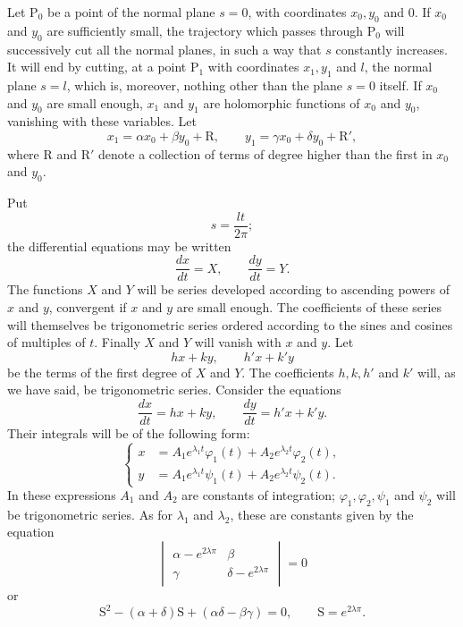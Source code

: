 \documentclass[11pt]{article}
\begin{document}
Let $\mathrm{P}_0$ be a point of the normal plane $s=0$, with coordinates $x_0,y_0$ and $0$. If $x_0$ and $y_0$ are sufficiently small, the trajectory which passes through $\mathrm{P}_0$ will successively cut all the normal planes, in such a way that $s$ constantly increases. It will end by cutting, at a point $\mathrm{P}_1$ with coordinates $x_1,y_1$ and $l$, the normal plane $s=l$, which is, moreover, nothing other than the plane $s=0$ itself. If $x_0$ and $y_0$ are small enough, $x_1$ and $y_1$ are holomorphic functions of $x_0$ and $y_0$, vanishing with these variables. Let
\[
x_1=\alpha x_0+\beta y_0+\mathrm{R},
\qquad
y_1=\gamma x_0+\delta y_0+\mathrm{R}',
\]
where $\mathrm{R}$ and $\mathrm{R}'$ denote a collection of terms of degree higher than the first in $x_0$ and $y_0$.

Put
\[
s=\frac{lt}{2\pi};
\]
the differential equations may be written
\[
\frac{dx}{dt}=X,
\qquad
\frac{dy}{dt}=Y.
\]
The functions $X$ and $Y$ will be series developed according to ascending powers of $x$ and $y$, convergent if $x$ and $y$ are small enough. The coefficients of these series will themselves be trigonometric series ordered according to the sines and cosines of multiples of $t$. Finally $X$ and $Y$ will vanish with $x$ and $y$. Let
\[
hx+ky,
\qquad
h'x+k'y
\]
be the terms of the first degree of $X$ and $Y$. The coefficients $h,k,h'$ and $k'$ will, as we have said, be trigonometric series. Consider the equations
\[
\frac{dx}{dt}=hx+ky,
\qquad
\frac{dy}{dt}=h'x+k'y.
\]
Their integrals will be of the following form:
\begin{equation}
\left\{
\begin{aligned}
x&=A_1e^{\lambda_1t}\varphi_1(t)+A_2e^{\lambda_2t}\varphi_2(t),\\
y&=A_1e^{\lambda_1t}\psi_1(t)+A_2e^{\lambda_2t}\psi_2(t).
\end{aligned}
\right.
\tag{1}
\end{equation}
In these expressions $A_1$ and $A_2$ are constants of integration; $\varphi_1,\varphi_2,\psi_1$ and $\psi_2$ will be trigonometric series. As for $\lambda_1$ and $\lambda_2$, these are constants given by the equation
\[
\begin{vmatrix}
\alpha-e^{2\lambda\pi}&\beta\\
\gamma&\delta-e^{2\lambda\pi}
\end{vmatrix}=0
\]
or
\begin{equation}
\mathrm{S}^2-(\alpha+\delta)\mathrm{S}+(\alpha\delta-\beta\gamma)=0,
\qquad
\mathrm{S}=e^{2\lambda\pi}.
\tag{2}
\end{equation}
\end{document}
